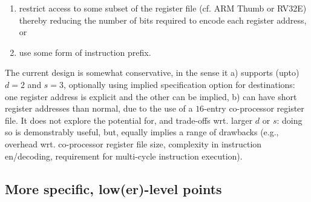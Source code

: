 \begin{itemize}
      \begin{enumerate}
      \item restrict access to some subset of the register file 
            (cf. ARM Thumb or RV32E) 
            thereby reducing the number of bits required to encode each  
            register address,
            or
      \item use some form of instruction prefix.
      \end{enumerate}
      
      \noindent
      The current design is somewhat conservative, in the sense it 
      a) supports (upto) $d = 2$ and $s = 3$, 
         optionally using implied specification option for destinations: 
         one register address is explicit and the other can be implied,
      b) can have short register addresses than normal, due to the use
         of a $16$-entry co-processor register file.
      It does not explore the potential for, and trade-offs wrt. larger 
      $d$ or $s$: doing so is demonstrably useful, but, equally implies
      a range of drawbacks (e.g., overhead wrt. co-processor register 
      file size, complexity in instruction en/decoding, requirement for
      multi-cycle instruction execution).

\end{itemize}


\subsection{More specific,  low(er)-level points}
\label{appx:discuss:lo}



